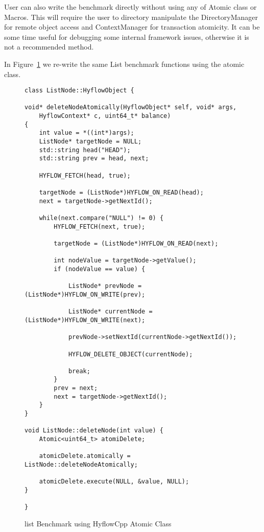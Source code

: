 \documentclass[12pt,english]{report}
\begin{document}
User can also write the benchmark directly without using any of Atomic class or Macros. This will require the user to directory manipulate the DirectoryManager for remote object access and ContextManager for transaction atomicity. It can be some time useful for debugging some internal framework issues, otherwise it is not a recommended method.

In Figure~\ref{Fig:listClassDelete} we re-write the same List benchmark functions using the atomic class. 

\begin{figure}
\centering
\begin{lstlisting}
class ListNode::HyflowObject {

void* deleteNodeAtomically(HyflowObject* self, void* args,
	HyflowContext* c, uint64_t* balance)
{
	int value = *((int*)args);
	ListNode* targetNode = NULL;
	std::string head("HEAD");
	std::string prev = head, next;

	HYFLOW_FETCH(head, true);
	
	targetNode = (ListNode*)HYFLOW_ON_READ(head);
	next = targetNode->getNextId();

	while(next.compare("NULL") != 0) {
		HYFLOW_FETCH(next, true);
		
		targetNode = (ListNode*)HYFLOW_ON_READ(next);
		
		int nodeValue = targetNode->getValue();
		if (nodeValue == value) {
		
			ListNode* prevNode = (ListNode*)HYFLOW_ON_WRITE(prev);
			
			ListNode* currentNode = (ListNode*)HYFLOW_ON_WRITE(next);
			
			prevNode->setNextId(currentNode->getNextId());
			
			HYFLOW_DELETE_OBJECT(currentNode);
			
			break;
		}
		prev = next;
		next = targetNode->getNextId();
	}
}

void ListNode::deleteNode(int value) {
	Atomic<uint64_t> atomiDelete;	
	
	atomicDelete.atomically = ListNode::deleteNodeAtomically;
	
	atomicDelete.execute(NULL, &value, NULL);
}

}
\end{lstlisting}
\caption{list Benchmark using HyflowCpp Atomic Class}
\label{Fig:listClassDelete}
\end{figure}

\end{document}
